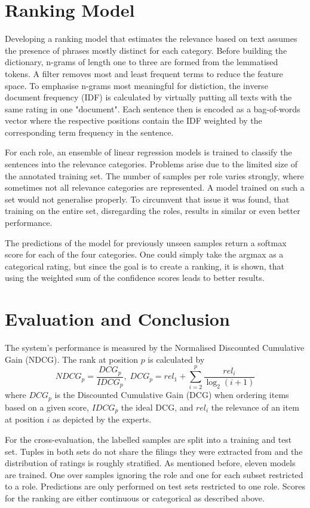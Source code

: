 \section{Ranking Model}
Developing a ranking model that estimates the relevance based on text assumes the presence of phrases mostly distinct for each category. Before building the dictionary, n-grams of length one to three are formed from the lemmatised tokens. A filter removes most and least frequent terms to reduce the feature space. To emphasise n-grams most meaningful for distiction, the inverse document frequency (IDF) is calculated by virtually putting all texts with the same rating in one "document". Each sentence then is encoded as a bag-of-words vector where the respective positions contain the IDF weighted by the corresponding term frequency in the sentence.

For each role, an ensemble of  linear regression models is trained to classify the sentences into the relevance categories. Problems arise due to the limited size of the annotated training set. The number of samples per role varies strongly, where sometimes not all relevance categories are represented. A model trained on such a set would not generalise properly. To circumvent that issue it was found, that training on the entire set, disregarding the roles, results in similar or even better performance.

The predictions of the model for previously unseen samples return a softmax score for each of the four categories. One could simply take the argmax as a categorical rating, but since the goal is to create a ranking, it is shown, that using the weighted sum of the confidence scores leads to better results.

\section{Evaluation and Conclusion}
The system's performance is measured by the Normalised Discounted Cumulative Gain (NDCG). The rank at position $p$ is calculated by
\begin{equation}
NDCG_p = \frac{DCG_p}{IDCG_p},\;
DCG_p = rel_1 + \sum_{i=2}^{p} \frac{rel_i}{\log_2(i+1)}
\end{equation}
where $DCG_p$ is the Discounted Cumulative Gain (DCG) when ordering items based on a given score, $IDCG_p$ the ideal DCG, and $rel_i$ the relevance of an item at position $i$ as depicted by the experts.

For the cross-evaluation, the labelled samples are split into a training and test set. Tuples in both sets do not share the filings they were extracted from and the distribution of ratings is roughly stratified. As mentioned before, eleven models are trained. One over samples ignoring the role and one for each subset restricted to a role. Predictions are only performed on test sets restricted to one role. Scores for the ranking are either continuous or categorical as described above.

